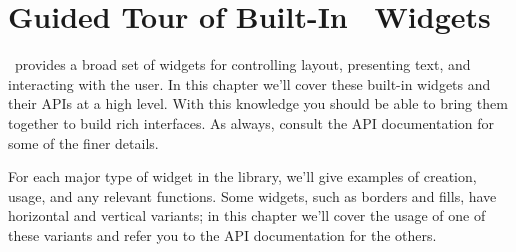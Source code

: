 \chapter{Guided Tour of Built-In \vtyui\ Widgets}
\label{chap:guided_tour}

\vtyui\ provides a broad set of widgets for controlling layout,
presenting text, and interacting with the user.  In this chapter we'll
cover these built-in widgets and their APIs at a high level.  With
this knowledge you should be able to bring them together to build rich
interfaces.  As always, consult the API documentation for some of the
finer details.

For each major type of widget in the library, we'll give examples of
creation, usage, and any relevant functions.  Some widgets, such as
borders and fills, have horizontal and vertical variants; in this
chapter we'll cover the usage of one of these variants and refer you
to the API documentation for the others.


















